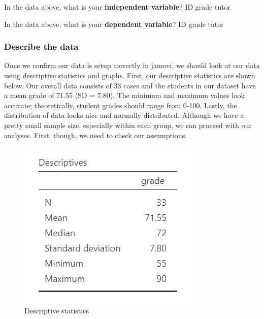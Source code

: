 \documentclass[
]{book}
\begin{document}
In the data above, what is your \textbf{independent variable}? ID grade tutor

In the data above, what is your \textbf{dependent variable}? ID grade tutor

\hypertarget{describe-the-data-1}{%
\subsubsection{Describe the data}\label{describe-the-data-1}}

Once we confirm our data is setup correctly in jamovi, we should look at our data using descriptive statistics and graphs. First, our descriptive statistics are shown below. Our overall data consists of 33 cases and the students in our dataset have a mean grade of 71.55 (SD = 7.80). The minimum and maximum values look accurate; theoretically, student grades should range from 0-100. Lastly, the distribution of data looks nice and normally distributed. Although we have a pretty small sample size, especially within each group, we can proceed with our analyses. First, though, we need to check our assumptions.

\begin{figure}

{\centering \includegraphics[width=0.8\linewidth]{images/02-independent_t-test/independent_t-test_descriptives_all} 

}

\caption{Descriptive statistics}\label{fig:unnamed-chunk-2}
\end{figure}
\end{document}
